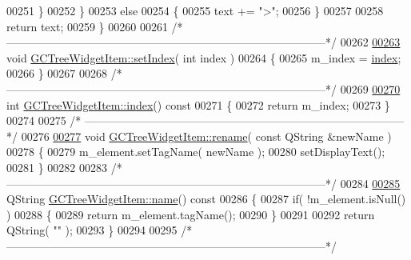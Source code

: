 \begin{DoxyCode}
00251     \}
00252   \}
00253   \textcolor{keywordflow}{else}
00254   \{
00255     text += \textcolor{stringliteral}{">"};
00256   \}
00257 
00258   \textcolor{keywordflow}{return} text;
00259 \}
00260 
00261 \textcolor{comment}{/*
      --------------------------------------------------------------------------------------*/}
00262 
\hypertarget{gctreewidgetitem_8cpp_source_l00263}{}\hyperlink{class_g_c_tree_widget_item_af1f6be4d3badc00db1f92de2e7deb71f}{00263} \textcolor{keywordtype}{void} \hyperlink{class_g_c_tree_widget_item_af1f6be4d3badc00db1f92de2e7deb71f}{GCTreeWidgetItem::setIndex}( \textcolor{keywordtype}{int} index )
00264 \{
00265   m\_index = \hyperlink{class_g_c_tree_widget_item_af6b48ae274cc4989811ef44944c8ad76}{index};
00266 \}
00267 
00268 \textcolor{comment}{/*
      --------------------------------------------------------------------------------------*/}
00269 
\hypertarget{gctreewidgetitem_8cpp_source_l00270}{}\hyperlink{class_g_c_tree_widget_item_af6b48ae274cc4989811ef44944c8ad76}{00270} \textcolor{keywordtype}{int} \hyperlink{class_g_c_tree_widget_item_af6b48ae274cc4989811ef44944c8ad76}{GCTreeWidgetItem::index}()\textcolor{keyword}{ const}
00271 \textcolor{keyword}{}\{
00272   \textcolor{keywordflow}{return} m\_index;
00273 \}
00274 
00275 \textcolor{comment}{/*
      --------------------------------------------------------------------------------------*/}
00276 
\hypertarget{gctreewidgetitem_8cpp_source_l00277}{}\hyperlink{class_g_c_tree_widget_item_a831acd54bf1060e3ec45a8e46439385a}{00277} \textcolor{keywordtype}{void} \hyperlink{class_g_c_tree_widget_item_a831acd54bf1060e3ec45a8e46439385a}{GCTreeWidgetItem::rename}( \textcolor{keyword}{const} QString &newName )
00278 \{
00279   m\_element.setTagName( newName );
00280   setDisplayText();
00281 \}
00282 
00283 \textcolor{comment}{/*
      --------------------------------------------------------------------------------------*/}
00284 
\hypertarget{gctreewidgetitem_8cpp_source_l00285}{}\hyperlink{class_g_c_tree_widget_item_a3af8c66a690cd55986a38b996a375ba4}{00285} QString \hyperlink{class_g_c_tree_widget_item_a3af8c66a690cd55986a38b996a375ba4}{GCTreeWidgetItem::name}()\textcolor{keyword}{ const}
00286 \textcolor{keyword}{}\{
00287   \textcolor{keywordflow}{if}( !m\_element.isNull() )
00288   \{
00289     \textcolor{keywordflow}{return} m\_element.tagName();
00290   \}
00291 
00292   \textcolor{keywordflow}{return} QString( \textcolor{stringliteral}{""} );
00293 \}
00294 
00295 \textcolor{comment}{/*
      --------------------------------------------------------------------------------------*/}

\end{DoxyCode}

